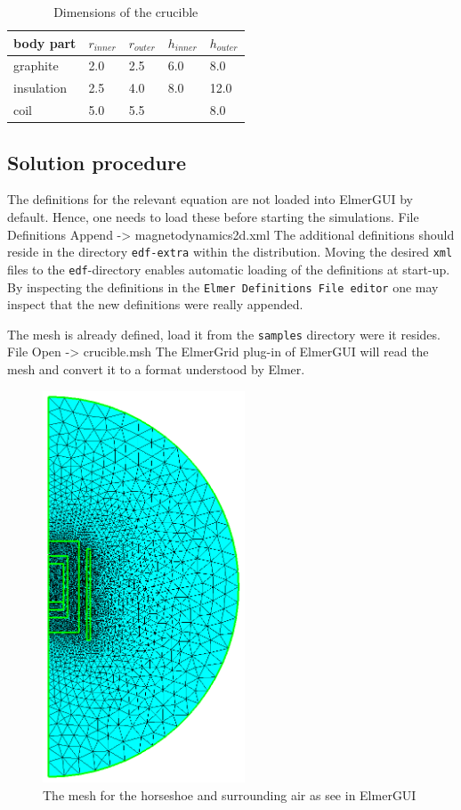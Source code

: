 \begin{table}
\caption{Dimensions of the crucible}
\label{tab:ind_heat_b}
\begin{center}
\begin{tabular}{lllll} \hline
body part &  $r_{inner}$ & $r_{outer}$ & $h_{inner}$ & $h_{outer}$ \\ \hline
graphite  &  2.0   &  2.5 & 6.0 & 8.0 \\
insulation &  2.5   &  4.0 & 8.0 & 12.0 \\
coil      &  5.0   & 5.5  &     & 8.0  \\ \hline
\end{tabular}
\end{center}
\end{table}

\subsection*{Solution procedure}

The definitions for the relevant equation are not loaded into ElmerGUI by default. Hence, 
one needs to load these before starting the simulations.
\ttbegin
File 
  Definitions
    Append -> magnetodynamics2d.xml
\ttend
The additional definitions should reside in the directory \texttt{edf-extra} within the distribution.
Moving the desired \texttt{xml} files to the \texttt{edf}-directory enables automatic loading of the 
definitions at start-up. By inspecting the definitions in the \texttt{Elmer Definitions File editor} one
may inspect that the new definitions were really appended. 

The mesh is already defined, load it from the \texttt{samples} directory were it resides.
\ttbegin
File 
  Open -> crucible.msh
\ttend
The ElmerGrid plug-in of ElmerGUI will read the mesh and convert it to a format understood by Elmer. 

\begin{figure}[h]
\centering
\includegraphics[width=60mm]{crucible_mesh}
\caption{The mesh for the horseshoe and surrounding air as see in ElmerGUI}\label{fg:crucible_mesh}
\end{figure}  


